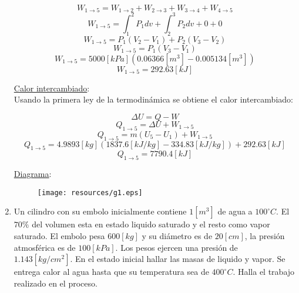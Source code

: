 \documentclass[letter,11pt]{article}
\begin{document}
\begin{enumerate}
\begin{equation*}
    W_{1\rightarrow 5}=W_{1\rightarrow 2}+W_{2\rightarrow 3}+
    W_{3\rightarrow 4}+W_{4\rightarrow 5}
\end{equation*}
\begin{equation*}
    W_{1\rightarrow 5}=\int_1^2 P_1 dv+\int_2^3 P_2 dv+0+0
\end{equation*}
\begin{equation*}
    W_{1\rightarrow 5}=P_1(V_2-V_1)+P_2(V_3-V_2)
\end{equation*}
\begin{equation*}
    W_{1\rightarrow 5}=P_1(V_3-V_1)
\end{equation*}
\begin{equation*}
    W_{1\rightarrow 5}=5000[kPa](0.06366[m^3]-0.005134[m^3])
\end{equation*}
\begin{equation*}
    W_{1\rightarrow 5}=292.63[kJ]
\end{equation*}

\underline{Calor intercambiado}:\\
Usando la primera ley de la termodinámica se obtiene el calor intercambiado:

\begin{equation*}
    \Delta U=Q-W
\end{equation*}
\begin{equation*}
    Q_{1\rightarrow 5}=\Delta U+W_{1\rightarrow 5}
\end{equation*}
\begin{equation*}
    Q_{1\rightarrow 5}=m(U_5-U_1)+W_{1\rightarrow 5}
\end{equation*}
\begin{equation*}
    Q_{1\rightarrow 5}=4.9893[kg](1837.6[kJ/kg]-334.83[kJ/kg])+292.63[kJ]
\end{equation*}
\begin{equation*}
    Q_{1\rightarrow 5}=7790.4[kJ]
\end{equation*}

\underline{Diagrama}:\\

\begin{figure}[!h]
\centering
\texttt{[image: resources/g1.eps]}
\end{figure}

\newpage

\item Un cilindro con su embolo inicialmente contiene $1[m^3]$ de agua a
$100^\circ C$. El $70\%$ del volumen esta en estado liquido saturado y el resto
como vapor saturado. El embolo pesa $600[kg]$ y su diámetro es de $20[cm]$, la
presión atmosférica es de $100[kPa]$. Los pesos ejercen una presión de
$1.143[kg/cm^2]$. En el estado inicial hallar las masas de liquido y vapor. Se
entrega calor al agua hasta que su temperatura sea de $400^\circ C$. Halla el
trabajo realizado en el proceso.


\end{enumerate}
\end{document}
